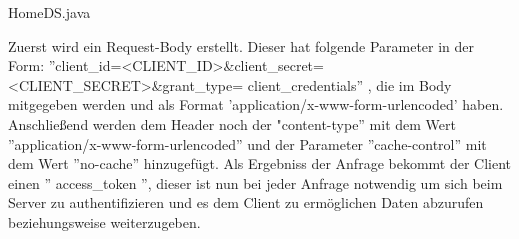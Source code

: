 HomeDS\HomeDsBackend\src\main\java\at\htl\utils\AuthentificationHandler.java

Zuerst wird ein Request-Body erstellt. Dieser hat folgende Parameter in der Form: 
 ''client\_id=<CLIENT\_ID>\&client\_secret=<CLIENT\_SECRET>\&grant\_type=
 client\_credentials''
, die im Body mitgegeben werden und als Format 'application/x-www-form-urlencoded'  haben. Anschließend werden dem Header noch der "content-type'' mit dem Wert ''application/x-www-form-urlencoded'' und der Parameter ''cache-control'' mit dem Wert ''no-cache'' hinzugefügt. Als Ergebniss der Anfrage bekommt der Client einen '' access\_token '', dieser ist nun bei jeder Anfrage notwendig um sich beim Server zu authentifizieren und es dem Client zu ermöglichen Daten abzurufen beziehungsweise weiterzugeben.




